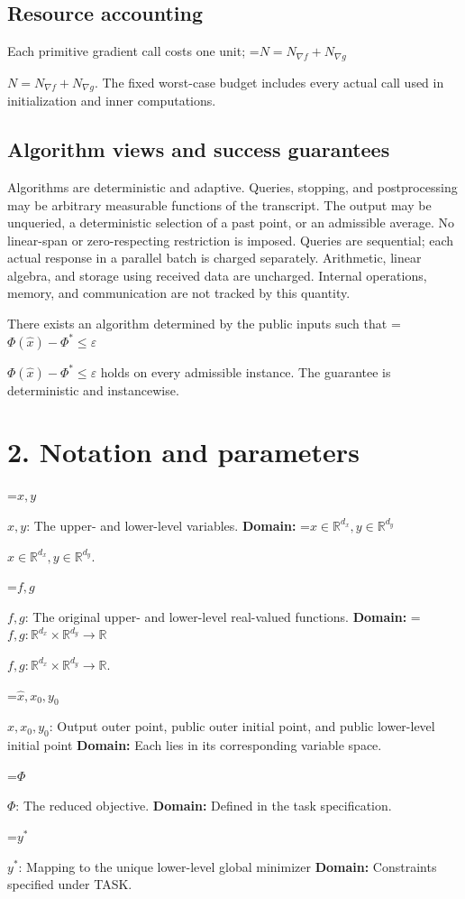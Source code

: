 \documentclass[10pt,a4paper]{article}
\newcommand{\AtlasMath}[1]{\par\begingroup\centering\setbox0=\hbox{$\displaystyle #1$}\ifdim\wd0>1.4\linewidth\typeout{ATLAS WIDE FORMULA: \the\wd0}\fi\ifdim\wd0>\linewidth\resizebox{\linewidth}{!}{\box0}\else\box0\fi\par\endgroup}
\newcommand{\AtlasInlineMath}[1]{\begingroup\setbox0=\hbox{$#1$}\ifdim\wd0>.4\linewidth\endgroup\AtlasMath{#1}\else\endgroup$#1$\fi}
\begin{document}
\subsection{Resource accounting}
Each primitive gradient call costs one unit; \AtlasInlineMath{N=N_{\nabla f}+N_{\nabla g}}. The fixed worst-case budget includes every actual call used in initialization and inner computations.

\subsection{Algorithm views and success guarantees}
Algorithms are deterministic and adaptive. Queries, stopping, and postprocessing may be arbitrary measurable functions of the transcript. The output may be unqueried, a deterministic selection of a past point, or an admissible average. No linear-span or zero-respecting restriction is imposed. Queries are sequential; each actual response in a parallel batch is charged separately. Arithmetic, linear algebra, and storage using received data are uncharged. Internal operations, memory, and communication are not tracked by this quantity.

There exists an algorithm determined by the public inputs such that \AtlasInlineMath{\Phi(\widehat{x})-\Phi^*\le\varepsilon} holds on every admissible instance. The guarantee is deterministic and instancewise.

\section{2. Notation and parameters}
\AtlasInlineMath{x,y}: The upper- and lower-level variables. \textbf{Domain:} \AtlasInlineMath{x\in\mathbb R^{d_x},y\in\mathbb R^{d_y}}.

\AtlasInlineMath{f,g}: The original upper- and lower-level real-valued functions. \textbf{Domain:} \AtlasInlineMath{f,g:\mathbb R^{d_x}\times\mathbb R^{d_y}\to\mathbb R}.

\AtlasInlineMath{\widehat x,x_0,y_0}: Output outer point, public outer initial point, and public lower-level initial point \textbf{Domain:} Each lies in its corresponding variable space.

\AtlasInlineMath{\Phi}: The reduced objective. \textbf{Domain:} Defined in the task specification.

\AtlasInlineMath{y^*}: Mapping to the unique lower-level global minimizer \textbf{Domain:} Constraints specified under TASK.
\end{document}
